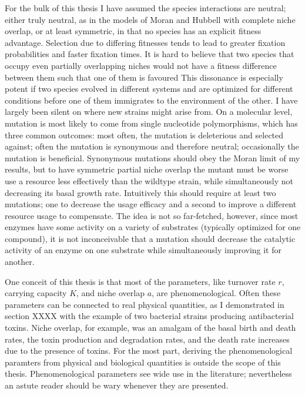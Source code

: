 For the bulk of this thesis I have assumed the species interactions are neutral; either truly neutral, as in the models of Moran and Hubbell with complete niche overlap, or at least symmetric, in that no species has an explicit fitness advantage. 
Selection due to differing fitnesses tends to lead to greater fixation probabilities and faster fixation times. 
It is hard to believe that two species that occupy even partially overlapping niches would not have a fitness difference between them such that one of them is favoured \cite{Leibold???}
This dissonance is especially potent if two species evolved in different systems and are optimized for different conditions before one of them immigrates to the environment of the other. 
I have largely been silent on where new strains might arise from. 
On a molecular level, mutation is most likely to come from single nucleotide polymorphisms, which has three common outcomes: most often, the mutation is deleterious and selected against; often the mutation is synonymous and therefore neutral; occasionally the mutation is beneficial. 
Synonymous mutations should obey the Moran limit of my results, but to have symmetric partial niche overlap the mutant must be worse use a resource less effectively than the wildtype strain, while simultaneously not decreasing its basal growth rate. 
Intuitively this should require at least two mutations; one to decrease the usage efficacy and a second to improve a different resource usage to compensate. 
The idea is not so far-fetched, however, since most enzymes have some activity on a variety of substrates (typically optimized for one compound), it is not inconceivable that a mutation should decrease the catalytic activity of an enzyme on one substrate while simultaneously improving it for another. 

One conceit of this thesis is that most of the parameters, like turnover rate $r$, carrying capacity $K$, and niche overlap $a$, are phenomenological. 
Often these parameters can be connected to real physical quantities, as I demonstrated in section XXXX with the example of two bacterial strains producing antibacterial toxins. 
Niche overlap, for example, was an amalgam of the basal birth and death rates, the toxin production and degradation rates, and the death rate increases due to the presence of toxins. 
For the most part, deriving the phenomenological paramters from physical and biological quantities is outside the scope of this thesis. 
Phenomenological parameters see wide use in the literature; nevertheless an astute reader should be wary whenever they are presented. 


